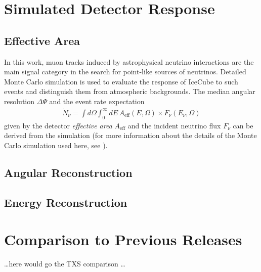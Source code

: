 \documentclass[aps,10pt,prd,twocolumn,floats,letterpaper,showpacs,nofootinbib,bibnotes,notitlepage,superscriptaddress]{revtex4-1}
\begin{document}
\section{Simulated Detector Response}

\subsection{Effective Area}

In this work, muon tracks induced by astrophysical neutrino interactions are
the main signal category in the search for point-like sources of neutrinos.
Detailed Monte Carlo simulation is used to evaluate the response of IceCube to
such events and distinguish them from atmospheric backgrounds. The median
angular resolution $\Delta\Psi$ and the event rate expectation
\begin{align}
    \dot{N}_\nu=\int d\Omega\int_0^\infty dE\,A_\mathrm{eff}\left(E, \Omega\right)
                \times F_\nu\left(E_\nu,\Omega\right)
    \label{eq:ev_rate}
\end{align}
given by the detector \emph{effective
area} $A_\mathrm{eff}$ and the incident neutrino flux $F_\nu$ can be derived
from the simulation (for more information about the details of the Monte Carlo
simulation used here, see \cite{Aartsen:2016xlq}).

\subsection{Angular Reconstruction}

\subsection{Energy Reconstruction}

\section{Comparison to Previous Releases}

{\ldots here would go the TXS comparison \ldots}

\begin{acknowledgements}

\end{acknowledgements}




\end{document}
